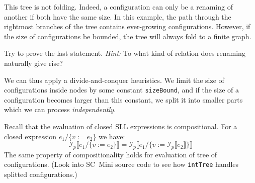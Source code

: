 This tree is not folding.
Indeed, a configuration can only be a renaming of another if both have the same size.
In this example, the path through the rightmost branches of the tree
contains ever-growing configurations.
However, if the size of configurations be bounded, the tree
will always fold to a finite graph.
\begin{exercise}
Try to prove the last statement. \textit{Hint:} To what kind of relation does
renaming naturally give rise?
\end{exercise}


We can thus apply a divide-and-conquer heuristics.
We limit the size of configurations inside nodes by some constant \texttt{sizeBound},
and if the size of a configuration becomes larger than this constant,
we split it into smaller parts which we can process \emph{independently}.

Recall that the evaluation of closed SLL expressions is compositional.
For a closed expression $e_1 / \{v := e_2\}$ we have:
\[\mathcal{I}_p\llbracket e_1 / \{v := e_2\}\rrbracket = \mathcal{I}_p \llbracket e_1 / \{v := \mathcal{I}_p\llbracket e_2\rrbracket\} \rrbracket\]
The same property of compositionality holds for evaluation of tree of configurations.
(Look into SC~Mini source code to see how \texttt{intTree} handles splitted configurations.)


%


